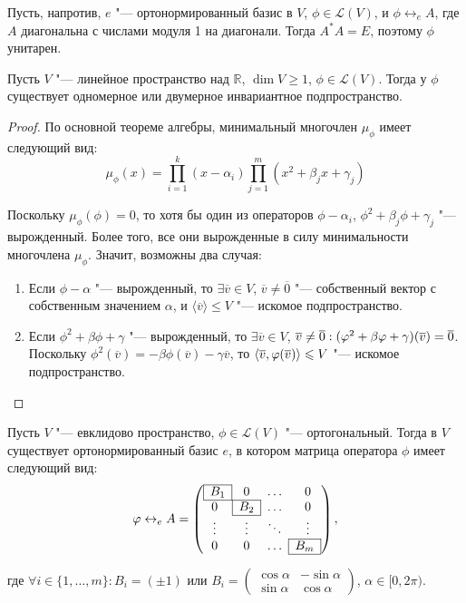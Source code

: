\begin{note}
	Пусть, напротив, $e$ "--- ортонормированный базис в $V$, $\phi \in \mathcal{L}(V)$, и $\phi \leftrightarrow_e A$, где $A$ диагональна с числами модуля 1 на диагонали. Тогда $A^*A = E$, поэтому $\phi$ унитарен.
\end{note}

\begin{proposition}
	Пусть $V$ "--- линейное пространство над $\mathbb{R}$, $\dim{V} \ge 1$, $\phi \in \mathcal{L}(V)$. Тогда у $\phi$ существует одномерное или двумерное инвариантное подпространство.
\end{proposition}

\begin{proof}
	По основной теореме алгебры, минимальный многочлен $\mu_\phi$ имеет следующий вид:
	\[\mu_\phi(x) = \prod_{i = 1}^k(x - \alpha_i)\prod_{j = 1}^m(x^2 + \beta_jx + \gamma_j)\]
	
	Поскольку $\mu_\phi(\phi) = 0$, то хотя бы один из операторов $\phi - \alpha_i$, $\phi^2 + \beta_j\phi + \gamma_j$ "--- вырожденный. Более того, все они вырожденные в силу минимальности многочлена $\mu_\phi$. Значит, возможны два случая:
	\begin{enumerate}
		\item Если $\phi - \alpha$ "--- вырожденный, то $\exists \overline{v} \in V$, $\overline{v} \ne \overline{0}$ "--- собственный вектор с собственным значением $\alpha$, и $\langle\overline{v}\rangle \le V$ "--- искомое подпространство.
		\item Если $\phi^2 + \beta\phi + \gamma$ "--- вырожденный, то $\exists \overline{v} \in V$, $\overline{v} \ne \overline{0}: (\phi^2 + \beta\phi \hm{+} \gamma)(\overline{v}) \hm{=} \overline{0}$. Поскольку $\phi^2(\overline{v}) = -\beta\phi(\overline{v}) - \gamma\overline{v}$, то $\langle\overline{v}, \phi(\overline{v})\rangle \hm{\le} V$ "--- искомое подпространство.\qedhere
	\end{enumerate}
\end{proof}

\begin{theorem}
	Пусть $V$ "--- евклидово пространство, $\phi \in \mathcal{L}(V)$ "--- ортогональный. Тогда в $V$ существует ортонормированный базис $e$, в котором матрица оператора $\phi$ имеет следующий вид:
	\[\phi \leftrightarrow_e A = \left(\begin{array}{@{}cccc@{}}
		\cline{1-1}
		\multicolumn{1}{|c|}{B_1} & 0 & \dots & 0\\
		\cline{1-2}
		0 & \multicolumn{1}{|c|}{B_2} & \dots & 0\\
		\cline{2-2}
		\vdots & \vdots & \ddots & \vdots\\
		\cline{4-4}
		0 & 0 & \dots & \multicolumn{1}{|c|}{B_m}\\
		\cline{4-4}
	\end{array}\right),\]
	
	где $\forall i \in \{1, \dots, m\}: B_i = (\pm1)$ или $B_i = \begin{pmatrix}\cos{\alpha}&-\sin{\alpha}\\
		\sin{\alpha}&\cos{\alpha}\end{pmatrix}$, $\alpha \in [0, 2\pi)$.
\end{theorem}

